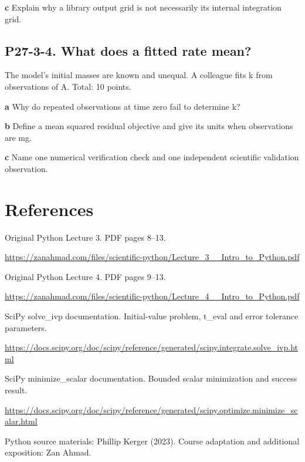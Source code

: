 \documentclass[11pt,letterpaper]{article}
\theoremstyle{definition}\newtheorem{definition}{Definition}\newtheorem{example}{Example}
\numberwithin{equation}{section}
\begin{document}
\textbf{c} Explain why a library output grid is not necessarily its internal integration grid.

\par\noindent\begin{minipage}{\linewidth}
\subsection*{P27-3-4. What does a fitted rate mean?}
The model's initial masses are known and unequal. A colleague fits k from observations of A. Total: 10 points.

\textbf{a} Why do repeated observations at time zero fail to determine k?

\end{minipage}\par\medskip
\textbf{b} Define a mean squared residual objective and give its units when observations are mg.

\textbf{c} Name one numerical verification check and one independent scientific validation observation.

\section*{References}
\noindent\begin{minipage}{\linewidth}
Original Python Lecture 3. PDF pages 8--13.

\url{https://zanahmad.com/files/scientific-python/Lecture_3__Intro_to_Python.pdf}
\end{minipage}\par\medskip
\noindent\begin{minipage}{\linewidth}
Original Python Lecture 4. PDF pages 9--13.

\url{https://zanahmad.com/files/scientific-python/Lecture_4__Intro_to_Python.pdf}
\end{minipage}\par\medskip
\noindent\begin{minipage}{\linewidth}
SciPy solve\_ivp documentation. Initial-value problem, t\_eval and error tolerance parameters.

\url{https://docs.scipy.org/doc/scipy/reference/generated/scipy.integrate.solve_ivp.html}
\end{minipage}\par\medskip
\noindent\begin{minipage}{\linewidth}
SciPy minimize\_scalar documentation. Bounded scalar minimization and success result.

\url{https://docs.scipy.org/doc/scipy/reference/generated/scipy.optimize.minimize_scalar.html}
\end{minipage}\par\medskip
Python source materials: Phillip Kerger (2023). Course adaptation and additional exposition: Zan Ahmad.
\end{document}
